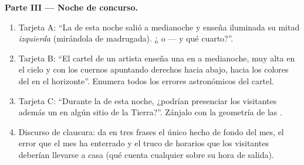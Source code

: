 \begin{problem}
\medskip\noindent\textbf{Parte III --- Noche de concurso.}
\begin{enumerate}[resume]
  \item Tarjeta A: ``La  de esta noche salió a medianoche y
        enseña iluminada su mitad \emph{izquierda} (mirándola de
        madrugada). ¿ o  --- y qué cuarto?''.
  \item Tarjeta B: ``El cartel de un artista enseña una  en
         a medianoche, muy alta en el cielo y con los
        cuernos apuntando derechos hacia abajo, hacia los colores del
         en el horizonte''. Enumera todos los errores
        astronómicos del cartel.
  \item Tarjeta C: ``Durante la  de esta noche, ¿podrían
        presenciar los visitantes además un  en algún
        sitio de la Tierra?''. Zánjalo con la geometría de las
        .
  \item Discurso de clausura: da en tres frases el único hecho de
        fondo del mes, el error que el mes ha enterrado y el truco de
        horarios que los visitantes deberían llevarse a casa (qué
        cuenta cualquier  sobre su hora de salida).
\end{enumerate}
\end{problem}
